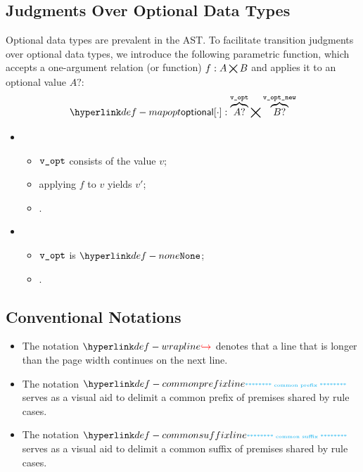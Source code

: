 \subsection{Judgments Over Optional Data Types}
\hypertarget{def-mapopt}{}
Optional data types are prevalent in the AST.
To facilitate transition judgments over optional data types,
we introduce the following parametric function,
which accepts a one-argument relation (or function) $f : A \bigtimes B$
and applies it to an optional value $A?$:
\[
\mapopt{\cdot} : \overname{A?}{\vvopt} \aslrel \overname{B?}{\vvoptnew}
\]

\ProseParagraph
\OneApplies
\begin{itemize}
  \item {}
  \begin{itemize}
    \item $\texttt{v\_opt}$ consists of the value $v$;
    \item applying $f$ to $v$ yields $v'$;
    \item {}.
  \end{itemize}

  \item {}
  \begin{itemize}
    \item $\texttt{v\_opt}$ is $\None$;
    \item \Proseeqdef{$\vvoptnew$}{$\None$}.
  \end{itemize}
\end{itemize}

\FormallyParagraph
{}

\subsection{Conventional Notations}
\hypertarget{def-wrapline}{}
\begin{itemize}
\item
The notation $\wrappedline$ denotes that a line that is longer than the page width continues on the next line.

\hypertarget{def-commonprefixline}{}
\item The notation $\commonprefixline$ serves as a visual aid to delimit a common prefix of premises shared by rule cases.

\hypertarget{def-commonsuffixline}{}
\item The notation $\commonsuffixline$ serves as a visual aid to delimit a common suffix of premises shared by rule cases.
\end{itemize}

